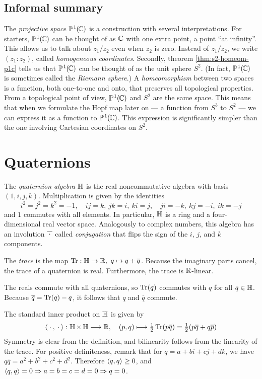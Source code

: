 \subsection*{Informal summary}
The \emph{projective space} $\PC$ is a construction with several interpretations.
For starters, $\PC$ can be thought of as $\C$ with one extra point,
a point “at infinity”.
This allows us to talk about $z_1/z_2$ even when $z_2$ is zero.
Instead of $z_1/z_2$, we write $(z_1 : z_2)$, called \emph{homogeneous coordinates}.
Secondly, theorem \ref{thm:s2-homeom-p1c} tells us that $\PC$ can be thought of as the unit sphere $S^2\!$.
(In fact, $\PC$ is sometimes called the \emph{Riemann sphere}.)
A \emph{homeomorphism} between two spaces
is a function, both one-to-one and onto,
that preserves all topological properties.
From a topological point of view, $\PC$ and $S^2$ are the same space.
This means that when we formulate the Hopf map later on
— a function from $S^3$ to $S^2$ —
we can express it as a function to $\PC$.
This expression is significantly simpler than the one involving Cartesian coordinates on $S^2\!$.

\section{Quaternions}
\label{sec:quaternions}

The \emph{quaternion algebra} $\H$ is
the real noncommutative algebra with basis $(1, i, j, k)$.
Multiplication is given by the identities
\[ i^2 = j^2 = k^2 = -1,
\quad i\!j =  k, \ jk =  i, \ ki =  j,
\quad j  i = -k, \ kj = -i, \ ik = -j \]
and $1$ commutes with all elements.
In particular, $\H$ is a ring and a four-dimensional real vector space.
Analogously to complex numbers,
this algebra has an involution $\overline{\raisebox{0pt}[0.5em]{${}\cdot{}$}}$
called \emph{conjugation}
that flips the sign of the $i$, $j$, and $k$ components.

The \emph{trace} is the map $\Tr : \H \to \R,\ q \mapsto q + \overline{q}$.
Because the imaginary parts cancel, the trace of a quaternion is real.
Furthermore, the trace is $\R$-linear.

The reals commute with all quaternions,
so $\Tr(q)$ commutes with $q$ for all $q \in \H$.
Because $\overline{q} = \Tr(q) - q$,
it follows that $q$ and $\overline{q}$ commute.

The standard inner product on $\H$ is given by
\[ \inp{{}\cdot{}}{{}\cdot{}} : \H \times \H \longto \R,
\quad (p, q) \longmapsto \tfrac{1}{2} \Tr(p\overline{q}) = \tfrac{1}{2}(p\overline{q} + q \overline{p}) \]
Symmetry is clear from the definition,
and bilinearity follows from the linearity of the trace.
For positive definiteness,
remark that for $q = a + bi + cj + dk$,
we have $q \overline{q} = a^2 + b^2 + c^2 + d^2\!$.
Therefore $\inp{q}{q} \geq 0$,
and $\inp{q}{q} = 0 \implies a = b = c = d = 0 \implies q = 0$.

